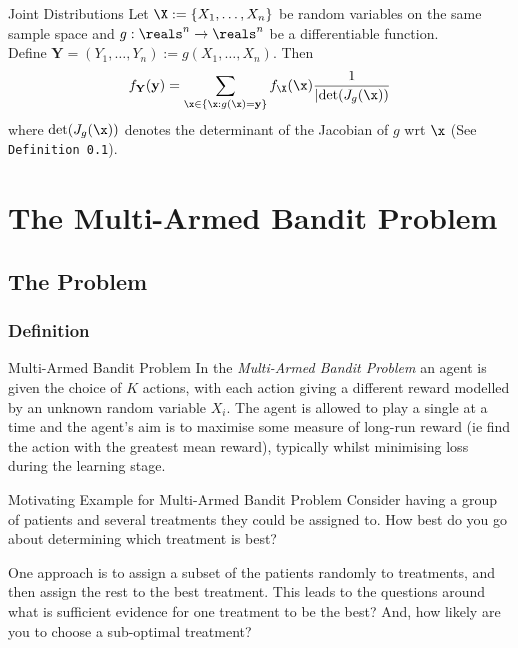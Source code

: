 \documentclass[11pt,a4paper]{article}
\begin{document}
  \begin{theorem}{Joint Distributions}
    Let $\X:=\{X_1,\dots,X_n\}$ be random variables on the same sample space and $g:\reals^n\to\reals^n$ be a differentiable function.\\
    Define $\mathbf{Y}=(Y_1,\dots,Y_n):=g(X_1,\dots,X_n)$. Then
    \[ f_\mathbf{Y}(\mathbf{y})=\sum_{\x\in\{\x:g(\x)=\mathbf{y}\}}f_\X(\x)\frac1{|\text{det}(J_g(\x))} \]
    where $\text{det}(J_g(\x))$ denotes the determinant of the Jacobian of $g$ wrt $\x$ (See \texttt{Definition 0.1}).
  \end{theorem}

\section{The Multi-Armed Bandit Problem}

\subsection{The Problem}

  \subsubsection*{Definition}

  \begin{definition}{Multi-Armed Bandit Problem}
    In the \textit{Multi-Armed Bandit Problem} an agent is given the choice of $K$ actions, with each action giving a different reward modelled by an unknown random variable $X_i$. The agent is allowed to play a single at a time and the agent's aim is to maximise some measure of long-run reward (ie find the action with the greatest mean reward), typically whilst minimising loss during the learning stage.
  \end{definition}

  \begin{example}{Motivating Example for Multi-Armed Bandit Problem}
    Consider having a group of patients and several treatments they could be assigned to. How best do you go about determining which treatment is best?
    \par One approach is to assign a subset of the patients randomly to treatments, and then assign the rest to the best treatment. This leads to the questions around what is sufficient evidence for one treatment to be the best? And, how likely are you to choose a sub-optimal treatment?
  \end{example}
\end{document}
